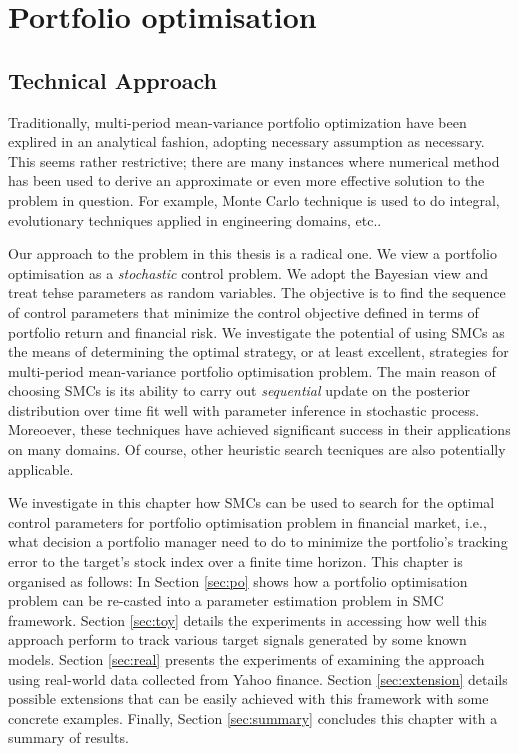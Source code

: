 \chapter{Portfolio optimisation}
\graphicspath{{Chapter4/figures/}}
\label{StaticSecurityPolicyInference}
\label{ch:experiment}

\section{Technical Approach}
Traditionally, multi-period mean-variance portfolio optimization have been explired in an analytical fashion, adopting necessary assumption as necessary. This seems rather restrictive; there are many instances where numerical method has been used to derive an approximate or even more effective solution to the problem in question. For example, Monte Carlo technique is used to do integral, evolutionary techniques applied in engineering domains, etc..

Our approach to the problem in this thesis is a radical one. We view a portfolio optimisation as a \emph{stochastic} control problem. We adopt the Bayesian view and treat tehse parameters as random variables. The objective is to find the sequence of control parameters that minimize the control objective defined in terms of portfolio return and financial risk. We investigate the potential of using SMCs as the means of determining the optimal strategy, or at least excellent, strategies for multi-period mean-variance portfolio optimisation problem. The main reason of choosing SMCs is its ability to carry out \emph{sequential} update on the posterior distribution over time fit well with parameter inference in stochastic process. Moreoever, these techniques have achieved significant success in their applications on many domains. Of course, other heuristic search tecniques are also potentially applicable.

We investigate in this chapter how SMCs can be used to search for the optimal control parameters for portfolio optimisation problem in financial market, i.e., what decision a portfolio manager need to do to minimize the portfolio's tracking error to the target's stock index over a finite time horizon. This chapter is organised as follows: In Section \ref{sec:po}  shows how a portfolio optimisation problem can be re-casted into a parameter estimation problem in SMC framework. Section \ref{sec:toy} details the experiments in accessing how well this approach perform to track various target signals generated by some known models. Section \ref{sec:real} presents the experiments of examining the approach using real-world data collected from Yahoo finance. Section \ref{sec:extension} details possible extensions that can be easily achieved with this framework with some concrete examples. Finally, Section \ref{sec:summary} concludes this chapter with a summary of results.

